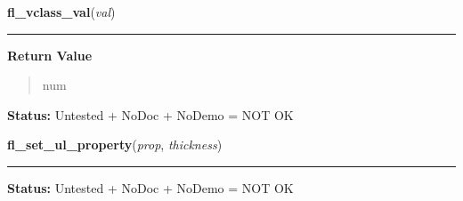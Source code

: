     \label{xformslib:library:fl_vclass_val}

    \vspace{0.5ex}

\hspace{.8\funcindent}\begin{boxedminipage}{\funcwidth}

    \raggedright \textbf{fl\_vclass\_val}(\textit{val})

    \vspace{-1.5ex}

    \rule{\textwidth}{0.5\fboxrule}
\setlength{\parskip}{2ex}
\setlength{\parskip}{1ex}
      \textbf{Return Value}
    \vspace{-1ex}

      \begin{quote}
      num

      \end{quote}

\textbf{Status:} Untested + NoDoc + NoDemo = NOT OK



    \end{boxedminipage}

    \label{xformslib:library:fl_set_ul_property}

    \vspace{0.5ex}

\hspace{.8\funcindent}\begin{boxedminipage}{\funcwidth}

    \raggedright \textbf{fl\_set\_ul\_property}(\textit{prop}, \textit{thickness})

    \vspace{-1.5ex}

    \rule{\textwidth}{0.5\fboxrule}
\setlength{\parskip}{2ex}
\setlength{\parskip}{1ex}
\textbf{Status:} Untested + NoDoc + NoDemo = NOT OK



    \end{boxedminipage}

    \label{xformslib:library:fl_set_clipping}

